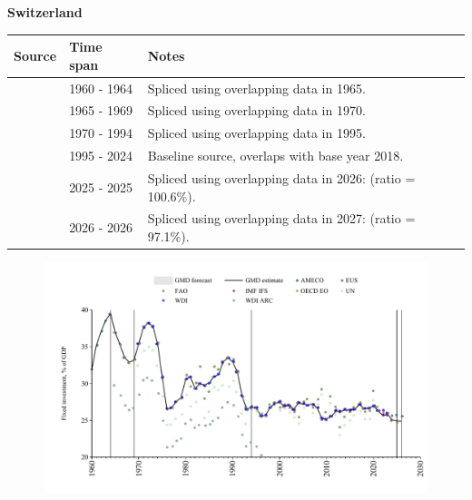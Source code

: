 \documentclass[12pt,a4paper,landscape]{article}
\begin{document}
\begin{adjustbox}{max totalsize={\paperwidth}{\paperheight},center}
\begin{minipage}[t][\textheight][t]{\textwidth}
\vspace*{0.5cm}
{}
\begin{center}
{\Large\bfseries Switzerland}
\end{center}
\vspace{0.5cm}
\begin{table}[H]
\centering
\small
\begin{tabular}{|l|l|l|}
\hline
\textbf{Source} & \textbf{Time span} & \textbf{Notes} \\
\hline
\rowcolor{white}\cite{AMECO}& 1960 - 1964 &Spliced using overlapping data in 1965.\\
\rowcolor{lightgray}\cite{OECD_EO}& 1965 - 1969 &Spliced using overlapping data in 1970.\\
\rowcolor{white}\cite{WDI}& 1970 - 1994 &Spliced using overlapping data in 1995.\\
\rowcolor{lightgray}\cite{EUS}& 1995 - 2024 &Baseline source, overlaps with base year 2018.\\
\rowcolor{white}\cite{OECD_EO}& 2025 - 2025 &Spliced using overlapping data in 2026: (ratio = 100.6\%).\\
\rowcolor{lightgray}\cite{AMECO}& 2026 - 2026 &Spliced using overlapping data in 2027: (ratio = 97.1\%).\\
\hline
\end{tabular}
\end{table}
\begin{figure}[H]
\centering
\includegraphics[width=\textwidth,height=0.6\textheight,keepaspectratio]{graphs/CHE_finv_GDP.pdf}
\end{figure}
\end{minipage}
\end{adjustbox}
\end{document}
